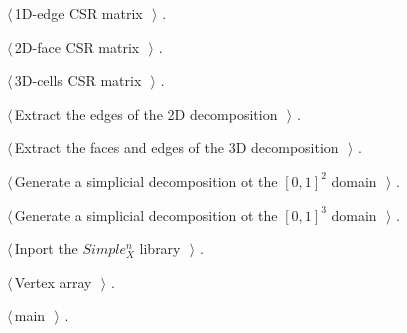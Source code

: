 \documentclass[11pt,oneside]{article}	%
\begin{document}
{\small\begin{list}{}{\setlength{\itemsep}{-\parsep}\setlength{\itemindent}{-\leftmargin}}
\item $\langle\,$1D-edge CSR matrix\nobreak\ {\footnotesize {}}$\,\rangle$ {\footnotesize {\NWtxtRefIn} .}
\item $\langle\,$2D-face CSR matrix\nobreak\ {\footnotesize {}}$\,\rangle$ {\footnotesize {\NWtxtRefIn} .}
\item $\langle\,$3D-cells CSR matrix\nobreak\ {\footnotesize {}}$\,\rangle$ {\footnotesize {\NWtxtRefIn} .}
\item $\langle\,$Extract the edges of the 2D decomposition\nobreak\ {\footnotesize {}}$\,\rangle$ {\footnotesize {\NWtxtRefIn} .}
\item $\langle\,$Extract the faces and edges of the 3D decomposition\nobreak\ {\footnotesize {}}$\,\rangle$ {\footnotesize {\NWtxtRefIn} .}
\item $\langle\,$Generate a simplicial decomposition ot the $[0,1]^2$ domain\nobreak\ {\footnotesize {}}$\,\rangle$ {\footnotesize {\NWtxtRefIn} .}
\item $\langle\,$Generate a simplicial decomposition ot the $[0,1]^3$ domain\nobreak\ {\footnotesize {}}$\,\rangle$ {\footnotesize {\NWtxtRefIn} .}
\item $\langle\,$Inport the $Simple_X^n$ library\nobreak\ {\footnotesize {}}$\,\rangle$ {\footnotesize {\NWtxtRefIn} .
}
\item $\langle\,$Vertex array\nobreak\ {\footnotesize {}}$\,\rangle$ {\footnotesize {\NWtxtRefIn} .}
\item $\langle\,$main\nobreak\ {\footnotesize {}}$\,\rangle$ {\footnotesize {\NWtxtRefIn} .}
\end{list}}




        
\appendix
\end{document}
